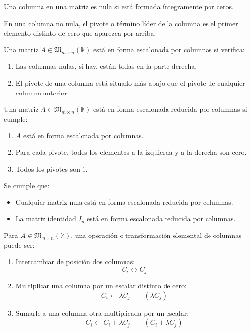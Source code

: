 \documentclass[a4paper,12pt]{article}
\begin{document}
\begin{procedimiento}[title=Columna nula]
Una columna en una matriz es nula si está formada íntegramente por ceros.
\end{procedimiento}

\begin{procedimiento}[title=Pivote o término líder]
En una columna no nula, el pivote o término líder de la columna es el primer elemento distinto de cero que aparezca por arriba.
\end{procedimiento}

\begin{procedimiento}[title=Forma escalonada por columnas]
Una matriz $A \in \mathfrak{M}_{m \times n}(\mathbb{K})$ está en forma escalonada por columnas si verifica:
\begin{enumerate}
\item Las columnas nulas, si hay, están todas en la parte derecha.
\item El pivote de una columna está situado más abajo que el pivote de cualquier columna anterior.
\end{enumerate}
\end{procedimiento}

\begin{procedimiento}[title=Forma escalonada reducida por columnas]
Una matriz $A \in \mathfrak{M}_{m \times n}(\mathbb{K})$ está en forma escalonada reducida por columnas si cumple:
\begin{enumerate}
\item $A$ está en forma escalonada por columnas.
\item Para cada pivote, todos los elementos a la izquierda y a la derecha son cero.
\item Todos los pivotes son 1.
\end{enumerate}

Se cumple que:
\begin{itemize}
\item Cualquier matriz nula está en forma escalonada reducida por columnas.
\item La matriz identidad $I_n$ está en forma escalonada reducida por columnas.
\end{itemize}
\end{procedimiento}

\begin{procedimiento}[title=Operación o Transformación de columnas]
Para $A \in \mathfrak{M}_{m \times n}(\mathbb{K})$, una operación o transformación elemental de columnas puede ser:
\begin{enumerate}
\item Intercambiar de posición dos columnas:
\[
C_i \longleftrightarrow C_j
\]
\item Multiplicar una columna por un escalar distinto de cero:
\[
C_i \longleftarrow \lambda C_j \qquad (\lambda C_j)
\]
\item Sumarle a una columna otra multiplicada por un escalar:
\[
C_i \longleftarrow C_i + \lambda C_j \qquad (C_i + \lambda C_j)
\]
\end{enumerate}
\end{procedimiento}
\end{document}
